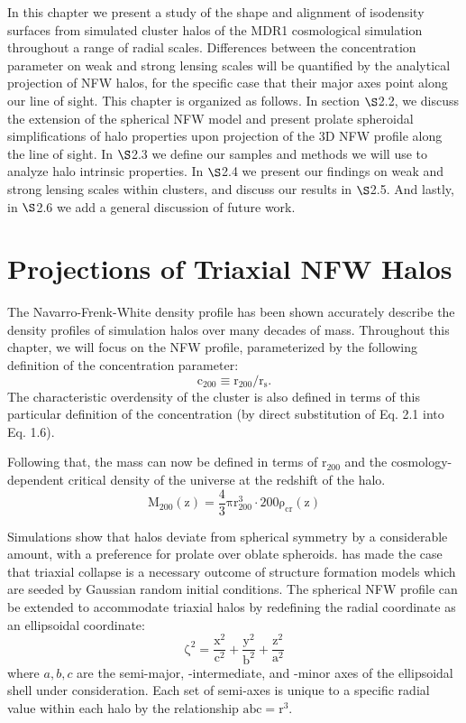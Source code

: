 In this chapter we present a study of the shape and alignment of
isodensity surfaces from simulated cluster halos of the MDR1
cosmological simulation \citep{PradaEtAl2012} throughout a range of radial
scales. Differences between the concentration parameter on weak and
strong lensing scales will be quantified by the analytical projection
of NFW halos, for the specific case that their major axes point along
our line of sight. This chapter is organized as follows. In section
$\S$2.2, we discuss the extension of the spherical NFW model and present
prolate spheroidal simplifications of halo properties upon projection
of the 3D NFW profile along the line of sight. In $\S$2.3 we define our
samples and methods we will use to analyze halo intrinsic
properties. In $\S$2.4 we present our findings on weak and strong
lensing scales within clusters, and discuss our results in $\S$2.5. And
lastly, in $\S$2.6 we add a general discussion of future work.  

\section[Triaxial Projections]{Projections of Triaxial NFW Halos}
The Navarro-Frenk-White density profile \citep{NFW1996} has been shown
accurately describe the density profiles of simulation halos over many decades
of mass. Throughout this chapter, we will focus on the NFW profile,
parameterized by the following definition of the concentration parameter:
\begin{equation}
\mathrm{c_{200} \equiv r_{200}/r_{s}}.
\end{equation}
The characteristic overdensity of the cluster is also defined in terms of this
particular definition of the concentration (by direct substitution of Eq. 2.1
into Eq. 1.6).

Following that, the mass can now be defined in terms of $\mathrm{r_{200}}$ and the
cosmology-dependent critical density of the universe at the redshift
of the halo. 
\begin{equation}
\mathrm{M_{200}(z) = \frac{4}{3} \pi r_{200}^{3} \cdot 200 \rho_{cr}(z)}
\end{equation} 

Simulations show that halos deviate from spherical symmetry by
a considerable amount, with a preference for prolate over oblate
spheroids. \citet{Doroshkevich1970} has made the case that triaxial
collapse is a necessary outcome of structure formation models which
are seeded by Gaussian random initial conditions. The spherical NFW
profile can be extended to accommodate triaxial halos by redefining
the radial coordinate as an ellipsoidal coordinate:  
\begin{equation}
\mathrm{\zeta^{2} = \frac{x^{2}}{c^{2}} + \frac{y^{2}}{b^{2}} + \frac{z^{2}}{a^{2}}}
\end{equation}
where $a,b,c$ are the semi-major, -intermediate, and -minor axes of
the ellipsoidal shell under consideration. Each set of semi-axes is
unique to a specific radial value within each halo by the relationship
$\mathrm{abc = r^{3}}$.   


